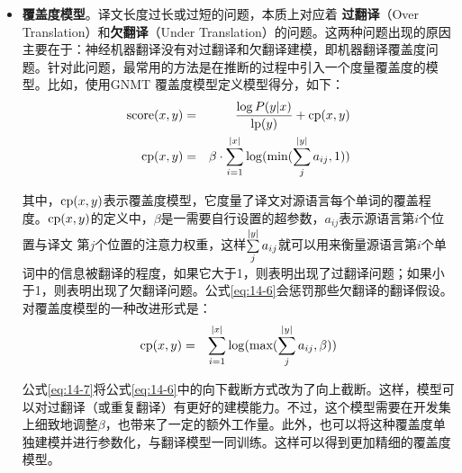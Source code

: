 \begin{itemize}
\item {\small\sffamily\bfseries{覆盖度模型}}。译文长度过长或过短的问题，本质上对应着 {\small\sffamily\bfseries{过翻译}}（Over Translation）和{\small\sffamily\bfseries{欠翻译}}（Under Translation）的问题。这两种问题出现的原因主要在于：神经机器翻译没有对过翻译和欠翻译建模，即机器翻译覆盖度问题。针对此问题，最常用的方法是在推断的过程中引入一个度量覆盖度的模型。比如，使用GNMT 覆盖度模型定义模型得分，如下：
\begin{eqnarray}
\textrm{score}({x},{y}) &=& \frac{\log {P}({y} | {x})}{\textrm{lp}({y})} + \textrm{cp}({x},{y}) \label {eq:14-5}\\
\textrm{cp}({x},{y}) &=& \beta \cdot \sum_{i=1}^{|{x}|} \log(\textrm{min} (\sum_{j}^{|{y}|} a_{ij} , 1))
\label{eq:14-6}
\end{eqnarray}

\noindent 其中，$\textrm{cp}({x},{y}) $表示覆盖度模型，它度量了译文对源语言每个单词的覆盖程度。$\textrm{cp}({x},{y}) $的定义中，$\beta$是一需要自行设置的超参数，$a_{ij}$表示源语言第$i$个位置与译文 第$j$个位置的注意力权重，这样$\sum \limits_{j}^{|{y}|} a_{ij}$就可以用来衡量源语言第$i$个单词中的信息被翻译的程度，如果它大于1，则表明出现了过翻译问题；如果小于1，则表明出现了欠翻译问题。公式\eqref{eq:14-6}会惩罚那些欠翻译的翻译假设。对覆盖度模型的一种改进形式是：
\begin{eqnarray}
\textrm{cp}({x},{y}) &=& \sum_{i=1}^{|{x}|} \log( \textrm{max} ( \sum_{j}^{|{y}|} a_{ij},\beta))
\label{eq:14-7}
\end{eqnarray}

\noindent 公式\eqref{eq:14-7}将公式\eqref{eq:14-6}中的向下截断方式改为了向上截断。这样，模型可以对过翻译（或重复翻译）有更好的建模能力。不过，这个模型需要在开发集上细致地调整$\beta$，也带来了一定的额外工作量。此外，也可以将这种覆盖度单独建模并进行参数化，与翻译模型一同训练。这样可以得到更加精细的覆盖度模型。
\vspace{0.5em}
\end{itemize}



